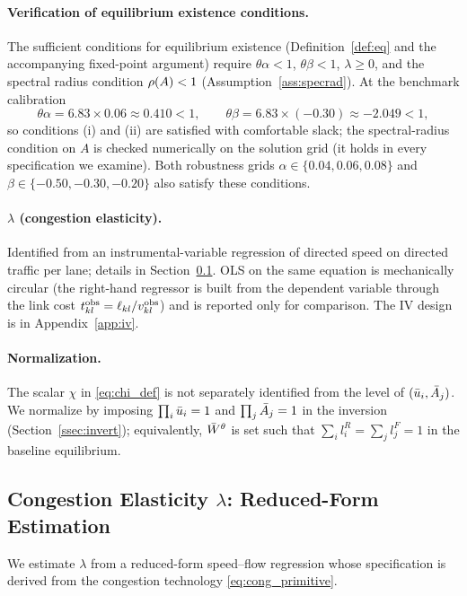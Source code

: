 \paragraph{Verification of equilibrium existence conditions.}
The sufficient conditions for equilibrium existence
(Definition~\ref{def:eq} and the accompanying fixed-point
argument) require $\theta\alpha<1$, $\theta\beta<1$, $\lambda\ge 0$,
and the spectral radius condition $\rho(A)<1$
(Assumption~\ref{ass:specrad}).  At the benchmark calibration
\begin{equation*}
  \theta\alpha=6.83\times 0.06\approx 0.410<1,
  \qquad
  \theta\beta=6.83\times(-0.30)\approx -2.049<1,
\end{equation*}
so conditions (i) and (ii) are satisfied with comfortable slack; the
spectral-radius condition on $A$ is checked numerically on the
solution grid (it holds in every specification we examine).  Both
robustness grids $\alpha\in\{0.04,0.06,0.08\}$ and
$\beta\in\{-0.50,-0.30,-0.20\}$ also satisfy these conditions.

\paragraph{$\lambda$ (congestion elasticity).}
Identified from an instrumental-variable regression of directed
speed on directed traffic per lane; details in
Section~\ref{ssec:lambdahat}.  OLS on the same equation is
mechanically circular (the right-hand regressor is built from the
dependent variable through the link cost
$t_{kl}^{\mathrm{obs}}=\ell_{kl}/v_{kl}^{\mathrm{obs}}$) and is reported only for
comparison.  The IV design is in Appendix~\ref{app:iv}.

\paragraph{Normalization.}
The scalar $\chi$ in \eqref{eq:chi_def} is not separately identified
from the level of $(\bar u_i,\bar A_j)$.  We normalize by imposing
$\prod_{i}\bar u_i=1$ and $\prod_{j}\bar A_j=1$ in the inversion
(Section~\ref{ssec:invert}); equivalently, $\bar W^{\theta}$ is set
such that $\sum_i l_i^R=\sum_j l_j^F=1$ in the baseline equilibrium.

\subsection{Congestion Elasticity $\lambda$: Reduced-Form Estimation}\label{ssec:lambdahat}

We estimate $\lambda$ from a reduced-form speed--flow regression
whose specification is derived from the congestion technology
\eqref{eq:cong_primitive}.

